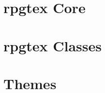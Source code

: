 \documentclass[size=10pt]{rpgbook}
\begin{document}
	\part{rpgtex Core}

		

	\part{rpgtex Classes}
		
		
		
	\part{Themes}
		
		
		\RpgActivateLayout{}
		
\end{document}
